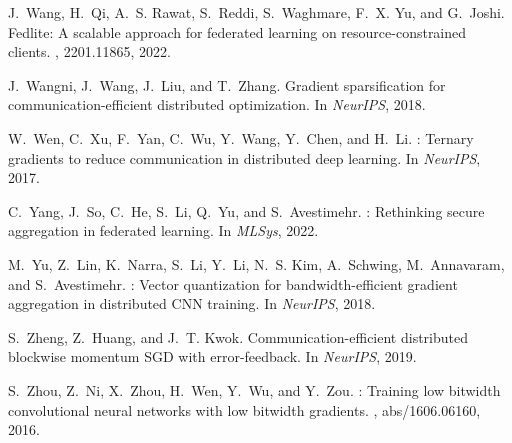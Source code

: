 \documentclass[11pt]{article}
\newcommand{\graham}[1]{{\color{green}Graham: #1}}
\begin{document}
\begin{thebibliography}{10}
\begin{small}
J.~Wang, H.~Qi, A.~S. Rawat, S.~Reddi, S.~Waghmare, F.~X. Yu, and G.~Joshi.
\newblock Fedlite: A scalable approach for federated learning on
  resource-constrained clients.
, 2201.11865, 2022.

J.~Wangni, J.~Wang, J.~Liu, and T.~Zhang.
\newblock Gradient sparsification for communication-efficient distributed
  optimization.
\newblock In {\em NeurIPS}, 2018.

W.~Wen, C.~Xu, F.~Yan, C.~Wu, Y.~Wang, Y.~Chen, and H.~Li.
: Ternary gradients to reduce communication in distributed
  deep learning.
\newblock In {\em NeurIPS}, 2017.

C.~Yang, J.~So, C.~He, S.~Li, Q.~Yu, and S.~Avestimehr.
: Rethinking secure aggregation in federated learning.
\newblock In {\em MLSys}, 2022.

M.~Yu, Z.~Lin, K.~Narra, S.~Li, Y.~Li, N.~S. Kim, A.~Schwing, M.~Annavaram, and
  S.~Avestimehr.
: Vector quantization for bandwidth-efficient gradient
  aggregation in distributed {CNN} training.
\newblock In {\em NeurIPS}, 2018.

S.~Zheng, Z.~Huang, and J.~T. Kwok.
\newblock Communication-efficient distributed blockwise momentum {SGD} with
  error-feedback.
\newblock In {\em NeurIPS}, 2019.

S.~Zhou, Z.~Ni, X.~Zhou, H.~Wen, Y.~Wu, and Y.~Zou.
: Training low bitwidth convolutional neural networks
  with low bitwidth gradients.
, abs/1606.06160, 2016.
\end{small}
\end{thebibliography}


%


\end{document}
